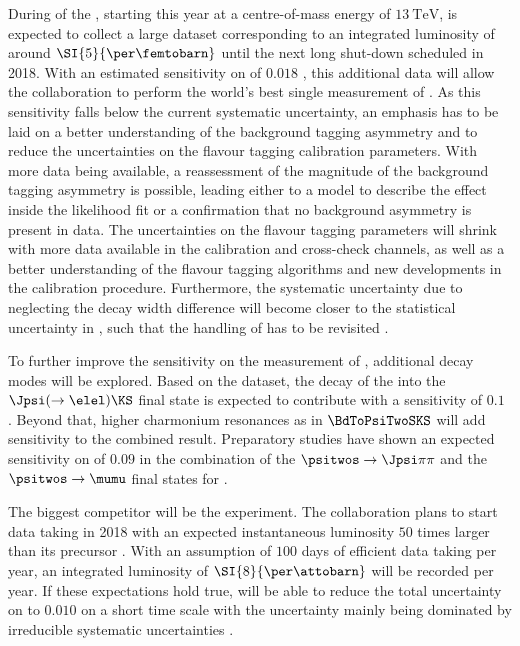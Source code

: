 During \RunTwo of the \LHC, starting this year at a centre-of-mass energy of
$\SI{13}{\TeV}$, \LHCb is expected to collect a large dataset corresponding to
an integrated luminosity of around $\SI{5}{\per\femtobarn}$ until the next long
shut-down scheduled in 2018. With an estimated sensitivity on \SJpsiKS of
$\num{0.018}$ \cite{Moedden:2015}, this additional data will allow the \LHCb
collaboration to perform the world's best single measurement of \sintwobeta. As
this sensitivity falls below the current systematic uncertainty, an emphasis has
to be laid on a better understanding of the background tagging asymmetry and to
reduce the uncertainties on the flavour tagging calibration parameters. With
more data being available, a reassessment of the magnitude of the background
tagging asymmetry is possible, leading either to a model to describe the effect
inside the likelihood fit or a confirmation that no background asymmetry is
present in data. The uncertainties on the flavour tagging parameters will shrink
with more data available in the calibration and cross-check channels, as well as
a better understanding of the flavour tagging algorithms and new developments in
the calibration procedure. Furthermore, the systematic uncertainty due to
neglecting the decay width difference \DGd will become closer to the statistical
uncertainty in \RunTwo, such that the handling of \DGd has to be revisited
\cite{Moedden:2015}.

To further improve the sensitivity on the measurement of \sintwobeta, additional
decay modes will be explored. Based on the \RunOne dataset, the decay of the \Bd
into the $\Jpsi (\to\elel) \KS$ final state is expected to contribute with a
sensitivity of $\num{0.1}$ \cite{bdtojpsieeks:ramon}. Beyond that, higher
charmonium resonances as in $\BdToPsiTwoSKS$ will add sensitivity to the
combined result. Preparatory studies have shown an expected sensitivity on
\sintwobeta of $\num{0.09}$ in the combination of the $\psitwos\to\Jpsi\pi\pi$
and the $\psitwos\to\mumu$ final states for \RunOne \cite{Mueller:2014}.

The biggest \LHCb competitor will be the \BelleTwo experiment. The collaboration
plans to start data taking in 2018 with an expected instantaneous luminosity
$\num{50}$ times larger than its precursor \Belle. With an assumption of
$\num{100}$ days of efficient data taking per year, an integrated luminosity of
$\SI{8}{\per\attobarn}$ will be recorded per year. If these expectations hold
true, \BelleTwo will be able to reduce the total uncertainty on \sintwobeta to
$\num{0.010}$ on a short time scale with the uncertainty mainly being dominated
by irreducible systematic uncertainties \cite{Aushev:2010bq}.

